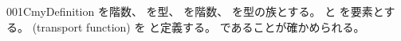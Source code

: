 \documentclass[index]{subfiles}
\begin{document}
\begin{myBlock}{001C}{myDefinition}
  を階数、
  を型、
  を階数、
  を型の族とする。
  と
  を要素とする。
  (transport function)
  を
  と定義する。
  であることが確かめられる。
\end{myBlock}
\end{document}
